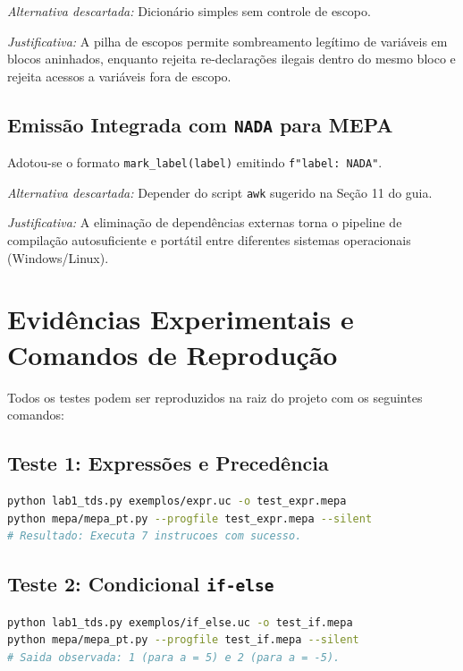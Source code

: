 \documentclass[12pt,a4paper]{article}
\begin{document}
\noindent\textit{Alternativa descartada:} Dicionário simples sem controle de escopo.

\noindent\textit{Justificativa:} A pilha de escopos permite sombreamento legítimo de variáveis
em blocos aninhados, enquanto rejeita re-declarações ilegais dentro do mesmo bloco e
rejeita acessos a variáveis fora de escopo.

\subsection{Emissão Integrada com \texttt{NADA} para MEPA}

Adotou-se o formato \texttt{mark\_label(label)} emitindo \texttt{f"{label}: NADA"}.

\noindent\textit{Alternativa descartada:} Depender do script \texttt{awk} sugerido na Seção 11 do guia.

\noindent\textit{Justificativa:} A eliminação de dependências externas torna o pipeline de
compilação autosuficiente e portátil entre diferentes sistemas operacionais (Windows/Linux).

\section{Evidências Experimentais e Comandos de Reprodução}

Todos os testes podem ser reproduzidos na raiz do projeto com os seguintes comandos:

\subsection{Teste 1: Expressões e Precedência}
\begin{lstlisting}[language=bash]
python lab1_tds.py exemplos/expr.uc -o test_expr.mepa
python mepa/mepa_pt.py --progfile test_expr.mepa --silent
# Resultado: Executa 7 instrucoes com sucesso.
\end{lstlisting}

\subsection{Teste 2: Condicional \texttt{if-else}}
\begin{lstlisting}[language=bash]
python lab1_tds.py exemplos/if_else.uc -o test_if.mepa
python mepa/mepa_pt.py --progfile test_if.mepa --silent
# Saida observada: 1 (para a = 5) e 2 (para a = -5).
\end{lstlisting}
\end{document}
